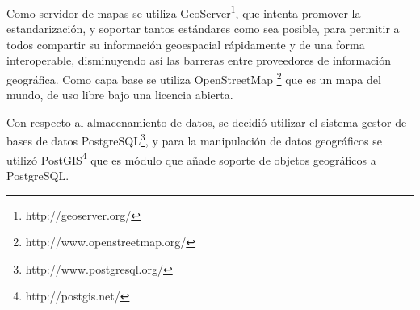 Como servidor de mapas se utiliza GeoServer\footnote{http://geoserver.org/}, que intenta promover
la estandarización, y soportar tantos estándares como sea posible, para permitir a todos compartir
su información geoespacial rápidamente y de una forma interoperable, disminuyendo así las barreras
entre proveedores de información geográfica. Como capa base se utiliza
OpenStreetMap \footnote{http://www.openstreetmap.org/} que es un mapa del mundo, de uso libre bajo
una licencia abierta.

Con respecto al almacenamiento de datos, se decidió utilizar el sistema gestor de bases de datos
PostgreSQL\footnote{http://www.postgresql.org/}, y para la manipulación de datos geográficos se
utilizó PostGIS\footnote{http://postgis.net/} que es módulo que añade soporte de objetos
geográficos a PostgreSQL.

